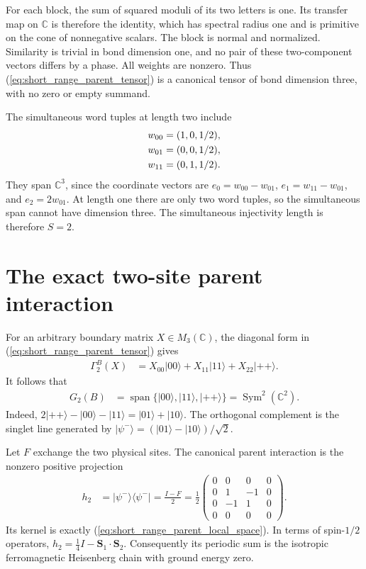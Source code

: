 \documentclass{article}
\begin{document}
For each block, the sum of squared moduli of its two letters is one.
Its transfer map on $\mathbb C$ is therefore the identity, which has
spectral radius one and is primitive on the cone of nonnegative scalars.
The block is normal and normalized. Similarity is trivial in bond
dimension one, and no pair of these two-component vectors differs by a
phase. All weights are nonzero. Thus
(\ref{eq:short_range_parent_tensor}) is a canonical tensor of bond
dimension three, with no zero or empty summand.

The simultaneous word tuples at length two include
\begin{align}
    w_{00}&=(1,0,1/2),\notag\\
    w_{01}&=(0,0,1/2),\notag\\
    w_{11}&=(0,1,1/2).
    \label{eq:short_range_parent_word_tuples}
\end{align}
They span $\mathbb C^3$, since the coordinate vectors are
$e_0=w_{00}-w_{01}$, $e_1=w_{11}-w_{01}$, and $e_2=2w_{01}$.
At length one there are only two word tuples, so the simultaneous span
cannot have dimension three. The simultaneous injectivity length is
therefore $S=2$.

\section{The exact two-site parent interaction}

For an arbitrary boundary matrix $X\in M_3(\mathbb C)$, the diagonal
form in (\ref{eq:short_range_parent_tensor}) gives
\begin{align}
    \Gamma_2^B(X)
      &=X_{00}|00\rangle+X_{11}|11\rangle+X_{22}|++\rangle.
    \label{eq:short_range_parent_boundary_map}
\end{align}
It follows that
\begin{align}
    G_2(B)
      &=\operatorname{span}\{|00\rangle,|11\rangle,|++\rangle\}
       =\operatorname{Sym}^2(\mathbb C^2).
    \label{eq:short_range_parent_local_space}
\end{align}
Indeed, $2|++\rangle-|00\rangle-|11\rangle=|01\rangle+|10\rangle$.
The orthogonal complement is the singlet line generated by
$|\psi^-\rangle=(|01\rangle-|10\rangle)/\sqrt2$.

Let $F$ exchange the two physical sites. The canonical parent interaction
is the nonzero positive projection
\begin{align}
    h_2&=|\psi^-\rangle\langle\psi^-|=\frac{I-F}{2}
       =\frac12
       \begin{pmatrix}
         0&0&0&0\\
         0&1&-1&0\\
         0&-1&1&0\\
         0&0&0&0
       \end{pmatrix}.
    \label{eq:short_range_parent_singlet}
\end{align}
Its kernel is exactly (\ref{eq:short_range_parent_local_space}). In terms
of spin-$1/2$ operators, $h_2=\frac14I-\mathbf S_1\cdot\mathbf S_2$.
Consequently its periodic sum is the isotropic ferromagnetic Heisenberg
chain with ground energy zero.
\end{document}
